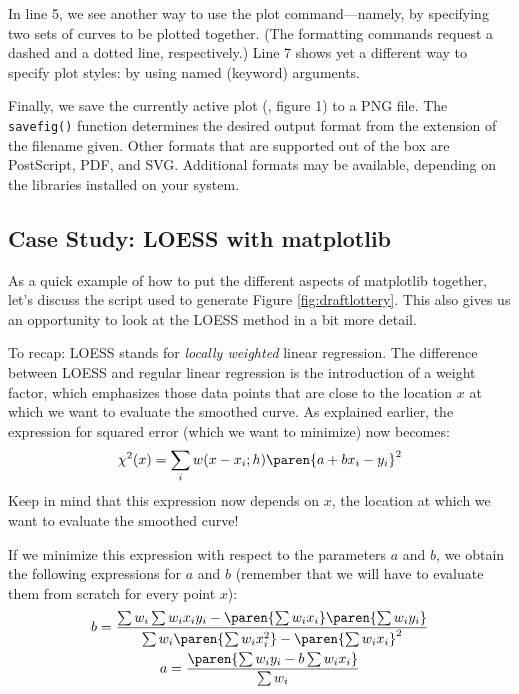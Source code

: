 In line 5, we see another way to use the plot command---namely, by
specifying two sets of curves to be plotted together. (The formatting
commands request a dashed and a dotted line, respectively.) Line 7
shows yet a different way to specify plot styles: by using named
(keyword) arguments.

Finally, we save the currently active plot (\ie, figure 1) to a
PNG file. The \texttt{savefig()} function determines the desired
output format from the extension of the filename given. Other formats
that are supported out of the box are PostScript, PDF, and SVG.
Additional formats may be available, depending on the libraries
installed on your system.


\subsection{Case Study: LOESS with matplotlib}
As a quick example of how to put the different aspects of matplotlib
together, let's discuss the script used to generate Figure
\ref{fig:draftlottery}. This also gives us an opportunity to look at
the LOESS method in a bit more detail.

To recap: LOESS stands for \emph{locally weighted} linear regression.
The difference between LOESS and regular linear regression is the introduction of a 
weight factor, which emphasizes those data points that are close to
the location $x$ at which we want to evaluate the smoothed curve. As
explained earlier, the expression for squared error (which we want to
minimize) now becomes:
%
\[
\chi^2(x) = \sum_i w( x-x_i; h ) \paren{ a + b x_i - y_i }^2
\]
%
Keep in mind that this expression now depends on $x$, the location
at which we want to evaluate the smoothed curve!

If we minimize this expression with respect to the parameters $a$ and
$b$, we obtain the following expressions for $a$ and $b$ (remember
that we will have to evaluate them from scratch for every point $x$):
\begin{gather*}
b = \frac{\sum w_i \sum w_i x_i y_i 
          - \paren{\sum w_i x_i} \paren{\sum w_i y_i} }
         {\sum w_i \paren{\sum w_i x_i^2} - \paren{\sum w_i x_i}^2 } \\
a = \frac{\paren{\sum w_i y_i - b \sum w_i x_i}}{\sum w_i}
\end{gather*}

